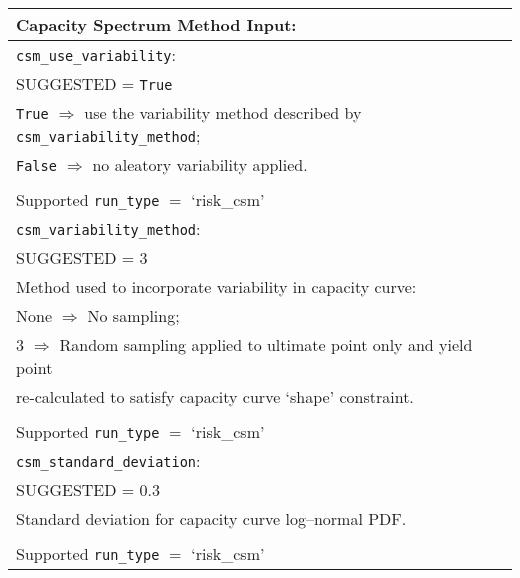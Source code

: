 \vspace{2em}
\begin{tabular}{|p{\textwidth}|}
\hline
\vspace{0.3em} \noindent \Large \textbf{Capacity Spectrum Method Input:} \normalsize \\
\hline \vspace{0.1em} \texttt{csm\_use\_variability}: \\
SUGGESTED = \texttt{True} \\
\hspace{0.5em} \texttt{True} $\Rightarrow$ use the variability method described by
\texttt{csm\_variability\_method};    \\
\hspace{0.5em} \texttt{False} $\Rightarrow$ no aleatory variability applied.  \\
\\
Supported \texttt{run\_type} $=$ `risk\_csm' \\
\hline \vspace{0.1em} \texttt{csm\_variability\_method}: \\
SUGGESTED = 3 \\
Method used to incorporate variability in capacity curve\index{capacity curve}: \\
 \hspace{0.5em} None $\Rightarrow$ No sampling; \\
 \hspace{0.5em} 3 $\Rightarrow$ Random sampling applied to ultimate
 point only and yield point \\
 \hspace{2.5em} re-calculated to satisfy capacity curve `shape' constraint. \\
 \\
Supported \texttt{run\_type} $=$ `risk\_csm' \\
\hline \vspace{0.1em} \texttt{csm\_standard\_deviation}: \\
SUGGESTED = 0.3 \\
Standard deviation for capacity curve\index{capacity curve} log--normal PDF.      \\
\\
Supported \texttt{run\_type} $=$ `risk\_csm' \\

\end{tabular}
